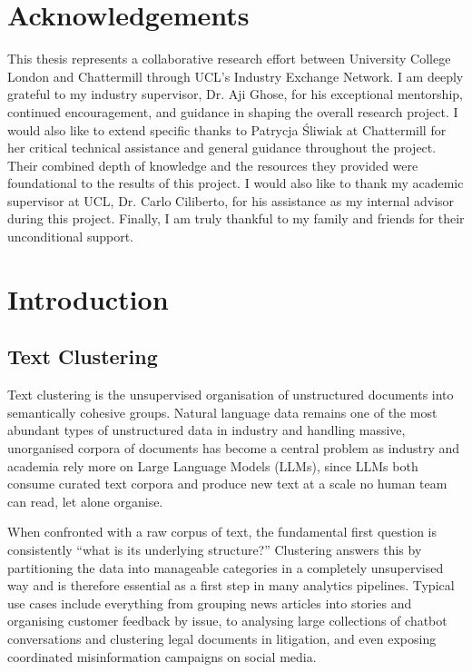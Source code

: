 \documentclass[11pt,a4paper,oneside]{report}
\begin{document}
\clearpage
\chapter*{Acknowledgements}

This thesis represents a collaborative research effort between University College London and Chattermill through UCL's Industry Exchange Network. I am deeply grateful to my industry supervisor, Dr. Aji Ghose, for his exceptional mentorship, continued encouragement, and guidance in shaping the overall research project. I would also like to extend specific thanks to Patrycja Śliwiak at Chattermill for her critical technical assistance and general guidance throughout the project. Their combined depth of knowledge and the resources they provided were foundational to the results of this project.  I would also like to thank my academic supervisor at UCL, Dr. Carlo Ciliberto, for his assistance as my internal advisor during this project. Finally, I am truly thankful to my family and friends for their unconditional support.

\clearpage
\tableofcontents
\clearpage
\listoffigures
\clearpage
\listoftables

\clearpage
{}
\chapter{Introduction}

\section{Text Clustering}

Text clustering is the unsupervised organisation of unstructured documents into semantically cohesive groups. Natural language data remains one of the most abundant types of unstructured data in industry and handling massive, unorganised corpora of documents has become a central problem as industry and academia rely more on Large Language Models (LLMs), since LLMs both consume curated text corpora and produce new text at a scale no human team can read, let alone organise.

When confronted with a raw corpus of text, the fundamental first question is consistently ``what is its underlying structure?'' Clustering answers this by partitioning the data into manageable categories in a completely unsupervised way and is therefore essential as a first step in many analytics pipelines. Typical use cases include everything from grouping news articles into stories and organising customer feedback by issue, to analysing large collections of chatbot conversations and clustering legal documents in litigation, and even exposing coordinated misinformation campaigns on social media.
\end{document}
